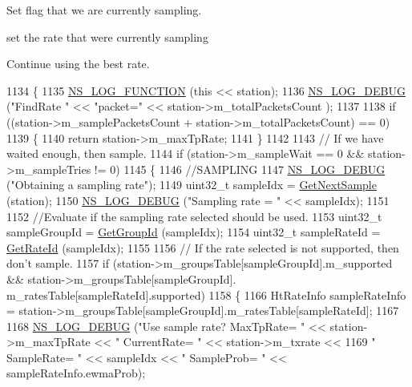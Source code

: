Set flag that we are currently sampling.

set the rate that we\textquotesingle{}re currently sampling

Continue using the best rate. 
\begin{DoxyCode}
1134 \{
1135   \hyperlink{log-macros-disabled_8h_a90b90d5bad1f39cb1b64923ea94c0761}{NS\_LOG\_FUNCTION} (\textcolor{keyword}{this} << station);
1136   \hyperlink{group__logging_ga413f1886406d49f59a6a0a89b77b4d0a}{NS\_LOG\_DEBUG} (\textcolor{stringliteral}{"FindRate "} << \textcolor{stringliteral}{"packet="} << station->m\_totalPacketsCount );
1137 
1138   \textcolor{keywordflow}{if} ((station->m\_samplePacketsCount + station->m\_totalPacketsCount) == 0)
1139     \{
1140       \textcolor{keywordflow}{return} station->m\_maxTpRate;
1141     \}
1142 
1143   \textcolor{comment}{// If we have waited enough, then sample.}
1144   \textcolor{keywordflow}{if} (station->m\_sampleWait == 0 && station->m\_sampleTries != 0)
1145     \{
1146       \textcolor{comment}{//SAMPLING}
1147       \hyperlink{group__logging_ga413f1886406d49f59a6a0a89b77b4d0a}{NS\_LOG\_DEBUG} (\textcolor{stringliteral}{"Obtaining a sampling rate"});
1149       uint32\_t sampleIdx = \hyperlink{classns3_1_1MinstrelHtWifiManager_a953e20a35850da21283123c92db93597}{GetNextSample} (station);
1150       \hyperlink{group__logging_ga413f1886406d49f59a6a0a89b77b4d0a}{NS\_LOG\_DEBUG} (\textcolor{stringliteral}{"Sampling rate = "} << sampleIdx);
1151 
1152       \textcolor{comment}{//Evaluate if the sampling rate selected should be used.}
1153       uint32\_t sampleGroupId = \hyperlink{classns3_1_1MinstrelHtWifiManager_a43157e6007b4b922043cb02a99ea6d1f}{GetGroupId} (sampleIdx);
1154       uint32\_t sampleRateId = \hyperlink{classns3_1_1MinstrelHtWifiManager_a6162341f1348bbe713d09642b09ac658}{GetRateId} (sampleIdx);
1155 
1156       \textcolor{comment}{// If the rate selected is not supported, then don't sample.}
1157       \textcolor{keywordflow}{if} (station->m\_groupsTable[sampleGroupId].m\_supported && station->m\_groupsTable[sampleGroupId].
      m\_ratesTable[sampleRateId].supported)
1158         \{
1166           HtRateInfo sampleRateInfo = station->m\_groupsTable[sampleGroupId].m\_ratesTable[sampleRateId];
1167 
1168           \hyperlink{group__logging_ga413f1886406d49f59a6a0a89b77b4d0a}{NS\_LOG\_DEBUG} (\textcolor{stringliteral}{"Use sample rate? MaxTpRate= "} << station->m\_maxTpRate << \textcolor{stringliteral}{"
       CurrentRate= "} << station->m\_txrate <<
1169                         \textcolor{stringliteral}{" SampleRate= "} << sampleIdx << \textcolor{stringliteral}{" SampleProb= "} << sampleRateInfo.ewmaProb);

\end{DoxyCode}

